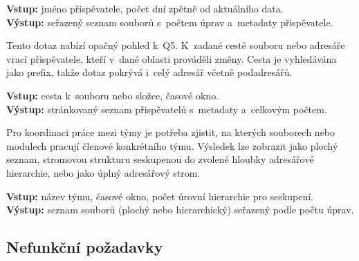 \begin{description}
    \textbf{Vstup:} jméno přispěvatele, počet dní zpětně od aktuálního data.\\
    \textbf{Výstup:} seřazený seznam souborů s~počtem úprav a~metadaty přispěvatele.

  \item[Q6 -- Přispěvatelé, kteří upravili soubor nebo složku]
    Tento dotaz nabízí opačný pohled k~Q5. K~zadané cestě souboru nebo adresáře vrací přispěvatele, kteří v~dané oblasti prováděli změny. Cesta je vyhledávána jako prefix, takže dotaz pokrývá i~celý adresář včetně podadresářů.

    \textbf{Vstup:} cesta k~souboru nebo složce, časové okno.\\
    \textbf{Výstup:} stránkovaný seznam přispěvatelů s~metadaty a~celkovým počtem.

  \item[Q7 -- Soubory upravené členy týmu]
    Pro koordinaci práce mezi týmy je potřeba zjistit, na kterých souborech nebo modulech pracují členové konkrétního týmu. Výsledek lze zobrazit jako plochý seznam, stromovou strukturu seskupenou do zvolené hloubky adresářové hierarchie, nebo jako úplný adresářový strom.

    \textbf{Vstup:} název týmu, časové okno, počet úrovní hierarchie pro seskupení.\\
    \textbf{Výstup:} seznam souborů (plochý nebo hierarchický) seřazený podle počtu úprav.

\end{description}

\subsection{Nefunkční požadavky}
\label{subsec:requirements:nonfunctional}

